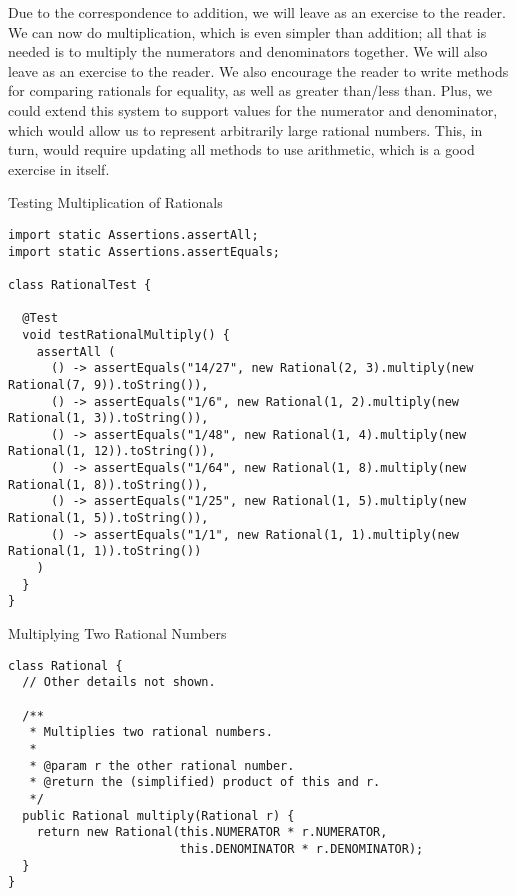 Due to the correspondence to addition, we will leave  as an exercise to the reader. We can now do multiplication, which is even simpler than addition; all that is needed is to multiply the numerators and denominators together. We will also leave  as an exercise to the reader. We also encourage the reader to write methods for comparing rationals for equality, as well as greater than/less than. Plus, we could extend this system to support  values for the numerator and denominator, which would allow us to represent arbitrarily large rational numbers. This, in turn, would require updating all methods to use  arithmetic, which is a good exercise in itself.

\begin{cl}{Testing Multiplication of Rationals}
\begin{lstlisting}[language=MyJava]
import static Assertions.assertAll;
import static Assertions.assertEquals;

class RationalTest {

  @Test
  void testRationalMultiply() {
    assertAll (
      () -> assertEquals("14/27", new Rational(2, 3).multiply(new Rational(7, 9)).toString()),
      () -> assertEquals("1/6", new Rational(1, 2).multiply(new Rational(1, 3)).toString()),
      () -> assertEquals("1/48", new Rational(1, 4).multiply(new Rational(1, 12)).toString()),
      () -> assertEquals("1/64", new Rational(1, 8).multiply(new Rational(1, 8)).toString()),
      () -> assertEquals("1/25", new Rational(1, 5).multiply(new Rational(1, 5)).toString()),
      () -> assertEquals("1/1", new Rational(1, 1).multiply(new Rational(1, 1)).toString())
    )
  }
}
\end{lstlisting}
\end{cl}

\begin{cl}{Multiplying Two Rational Numbers}
\begin{lstlisting}[language=MyJava]
class Rational {
  // Other details not shown.

  /**
   * Multiplies two rational numbers.
   *
   * @param r the other rational number.
   * @return the (simplified) product of this and r.
   */
  public Rational multiply(Rational r) {
    return new Rational(this.NUMERATOR * r.NUMERATOR, 
                        this.DENOMINATOR * r.DENOMINATOR);
  }
}
\end{lstlisting}
\end{cl}
